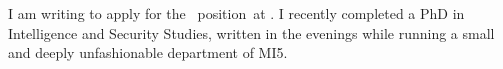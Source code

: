 
I am writing to apply for the \theposition\ position\maybeproject\maybedept\ at \theemployer\maybejobref. I recently completed a PhD in Intelligence and Security Studies, written in the evenings while running a small and deeply unfashionable department of MI5.\maybeappsentence
